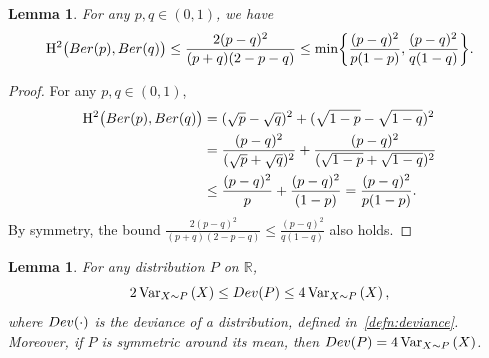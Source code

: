 \documentclass[12pt]{article}
\newtheorem{lemma}[theorem]{Lemma}
\newcommand{\R}{\mathbb{R}}
\newcommand{\Vp}[2]{\mathrm{Var}_{{#1}}\left({#2}\right)}
\begin{document}
\begin{lemma}\label{lem:hellinger_lemma}
For any $p,q\in (0,1)$, we have
    $$\mathrm{H}^2\bigl(\textnormal{Ber}(p),\textnormal{Ber}(q)\bigr)\leq \frac{2(p-q)^2}{(p+q)(2-p-q)}\leq \min\biggl\{\frac{(p-q)^2}{p(1-p)},\frac{(p-q)^2}{q(1-q)}\biggr\}.$$
\end{lemma}
\begin{proof}
For any $p,q\in (0,1)$,
\begin{align*}
    \mathrm{H}^2\bigl(\textnormal{Ber}(p),\textnormal{Ber}(q)\bigr) &= (\sqrt{p}-\sqrt{q})^2+(\sqrt{1-p}-\sqrt{1-q})^2\\
    &=\frac{(p-q)^2}{(\sqrt{p}+\sqrt{q})^2}+\frac{(p-q)^2}{(\sqrt{1-p}+\sqrt{1-q})^2}\\
    &\leq \frac{(p-q)^2}{p}+\frac{(p-q)^2}{(1-p)}= \frac{(p-q)^2}{p(1-p)}.
\end{align*}
By symmetry, the bound $\frac{2(p-q)^2}{(p+q)(2-p-q)} \leq \frac{(p-q)^2}{q(1-q)}$ also holds.
\end{proof}
\begin{lemma}\label{lem:deviance-and-variation}
    For any distribution $P$ on $\R$, 
    \[2\,\Vp{X\sim P}{X}\leq \textnormal{Dev}(P)\leq 4\,\Vp{X\sim P}{X},\] where $\textnormal{Dev}(\cdot)$ is the deviance of a distribution, defined in~\eqref{defn:deviance}. Moreover, if $P$ is symmetric around its mean, then $\textnormal{Dev}(P)=4\,\Vp{X\sim P}{X}$.
\end{lemma}
\end{document}
